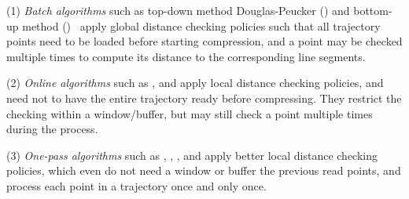 \sstab (1) {\em Batch algorithms} such as top-down method Douglas-Peucker (\dpa) \cite{Douglas:Peucker,Meratnia:Spatiotemporal} and bottom-up method \pavlidis (\tpa)~\cite{Pavlidis:Segment} apply global distance checking policies such that all trajectory points need to be loaded before starting compression, and a point may be checked multiple times to compute its distance to the corresponding line segments.

\sstab (2) {\em Online algorithms} such as \opwa \cite{Meratnia:Spatiotemporal}, \squishe \cite{Muckell:SQUISH} and \bqsa \cite{Liu:BQS} apply local distance checking policies, and need not to have the entire trajectory ready before compressing. They restrict the checking within a window/buffer, but may still check a point  multiple times during the process.

\sstab (3) {\em One-pass algorithms} such as \operb\cite{Lin:Operb}, \siped \cite{Williams:Longest,Sklansky:Cone,Dunham:Cone, Zhao:Sleeve}, \cised \cite{Lin:Cised}, \intersec\cite{Long:Direction} and \interval \cite{Ke:Interval} apply better local distance checking policies, which even do not need a window or buffer the previous read points, and process each point in a trajectory once and only once.





